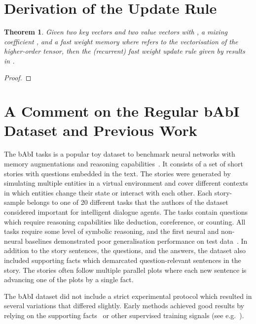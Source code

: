 \documentclass{article} \usepackage{iclr2021_conference,times}
\begin{document}
\section{Derivation of the Update Rule}
\label{appendix:sec:updateRule}
\newtheorem{theorem}{Theorem}[section]
\begin{theorem}
Given two key vectors  and two value vectors  with , a mixing coefficient , and a fast weight memory  where  refers to the vectorisation of the higher-order tensor, then the (recurrent) fast weight update rule given by  results in .
\end{theorem}

\begin{proof}

\end{proof}


\section{A Comment on the Regular bAbI Dataset and Previous Work}
The bAbI tasks is a popular toy dataset to benchmark neural networks with memory augmentations and reasoning capabilities~\citep{babi_tasks_weston}. 
It consists of a set of short stories with questions embedded in the text. 
The stories were generated by simulating multiple entities in a virtual environment and cover different contexts in which entities change their state or interact with each other.
Each story-sample belongs to one of 20 different tasks that the authors of the dataset considered important for intelligent dialogue agents. 
The tasks contain questions which require reasoning capabilities like deduction, coreference, or counting.
All tasks require some level of symbolic reasoning, and the first neural and non-neural baselines demonstrated poor generalisation performance on test data~\citep{babi_tasks_weston}.
In addition to the story sentences, the questions, and the answers, the dataset also included supporting facts which demarcated question-relevant sentences in the story. 
The stories often follow multiple parallel plots where each new sentence is advancing one of the plots by a single fact. 

The bAbI dataset did not include a strict experimental protocol which resulted in several variations that differed slightly.
Early methods achieved good results by relying on the supporting facts~\citep{weston2015memorynets, kumar2016dmn} or other supervised training signals (see e.g.~\citet{johnson2017transitions, Li2016gatedgraphs}).
\end{document}
